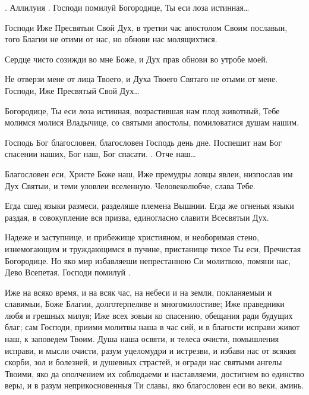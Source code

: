 \begin{mymulticols}
. Аллилуия . Господи помилуй  Богородице, Ты еси лоза истинная…


 Господи Иже Пресвятыи Свой Дух, в третии час апостолом Своим пославыи, того Благии не отими от нас, но обнови нас молящихтися.

 Сердце чисто созижди во мне Боже, и Дух прав обнови во утробе моей.


 Не отверзи мене от лица Твоего, и Духа Твоего Святаго не отыми от мене.  Господи, Иже Пресвятый Свой Дух…   

Богородице, Ты еси лоза истинная, возрастившая нам плод животный, Тебе молимся молися Владычице, со святыми апостолы, помиловатися душам нашим.


 Господь Бог благословен, благословен Господь день дне. Поспешит нам Бог спасении наших, Бог наш, Бог спасати. .  Отче наш… 


 Благословен еси, Христе Боже наш, Иже премудры ловцы явлеи, низпослав им Дух Святыи, и теми уловлеи вселенную. Человеколюбче, слава Тебе.

 Егда сшед языки размеси, разделяше племена Вышнии. Егда же огненыя языки раздая, в совокупление вся призва, единогласно славити Всесвятыи Дух.

 Надеже и заступнице, и прибежище християном, и необоримая стено, изнемогающим и труждающимся в пучине, пристанище тихое Ты еси, Пречистая Богородице. Но яко мир избавляеши непрестанною Си молитвою, помяни нас, Дево Всепетая. Господи помилуй .


 Иже на всяко время, и на всяк час, на небеси и на земли, покланяемыи и славимыи, Боже Благии, долготерпеливе и многомилостиве; Иже праведники любя и грешных милуя; Иже всех зовыи ко спасению, обещания ради будущих благ; сам Господи, приими молитвы наша в час сий, и в благости исправи живот наш, к заповедем Твоим. Душа наша освяти, и телеса очисти, помышления исправи, и мысли очисти, разум уцеломудри и истрезви, и избави нас от всякия скорби, зол и болезней, и душевных страстей, и огради нас святыми ангелы Твоими, яко да ополчением их соблюдаеми и наставляеми, достигнем во единство веры, и в разум неприкосновенныя Ти славы, яко благословен еси во веки, аминь. 


\end{mymulticols}

